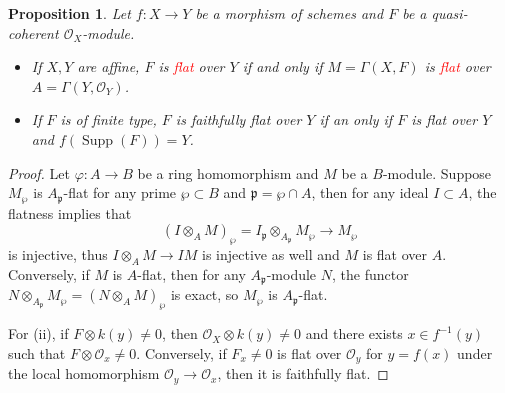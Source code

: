 \documentclass[leqno]{amsart}
\DeclareMathOperator{\Supp}{Supp}
\newcommand{\1}{\mathbf{1}}
\newcommand{\fp}{\mathfrak p}
\newtheorem{prop}[thm]{Proposition}
\theoremstyle{definition}
\theoremstyle{remark}
\newcommand{\red}[1]{\textcolor{Red}{#1}}
\begin{document}
\begin{prop}
	Let $f\colon X\to Y$ be a morphism of schemes
	and  $F$ be a quasi-coherent $\mathcal{O}_X$-module.
	\begin{itemize}
		\item If $X,Y$ are affine,
		$F$ is \red{flat} over $Y$ if and only if
		$M=\Gamma(X,F)$ is \red{flat}
		over $A=\Gamma(Y,\mathcal{O}_Y)$.
		\item If $F$ is of finite type,
		$F$ is faithfully flat over $Y$
		if an only if $F$ is flat over $Y$
		and $f(\Supp(F))=Y$.
	\end{itemize}
\end{prop}
\begin{proof}
	Let $\varphi\colon A\to B$ be a ring homomorphism
	and  $M$ be a $B$-module.
	Suppose  $M_\wp$ is  $A_\fp$-flat for any prime  $\wp\subset B$
	and  $\fp=\wp\cap A$,
	then for any ideal  $I\subset A$, the flatness implies that
	 \[
		 (I\otimes_AM)_\wp=I_\fp\otimes_{A_\fp}M_\wp\to M_\wp
	\]
	is injective, thus $I\otimes_AM\to IM$ is injective as well
	and $M$ is flat over  $A$.
	Conversely, if  $M$ is  $A$-flat, then for any  $A_\fp$-module  $N$,
	the functor  $N\otimes_{A_\fp}M_\wp=(N\otimes_AM)_\wp$ is exact,
	so $M_\wp$ is  $A_\fp$-flat.

	For (ii), if  $F\otimes k(y)\neq 0$, 
	then  $\mathcal{O}_X\otimes k(y)\neq 0$
	and there exists $x\in f^{-1}(y)$ 
	such that $F\otimes \mathcal{O}_x\neq 0$.
	Conversely, if $F_x\neq0$ is flat over $\mathcal{O}_y$
	for  $y=f(x)$ 
	under the local homomorphism  $\mathcal{O}_y\to \mathcal{O}_x$,
	then it is faithfully flat.
\end{proof}
\end{document}
